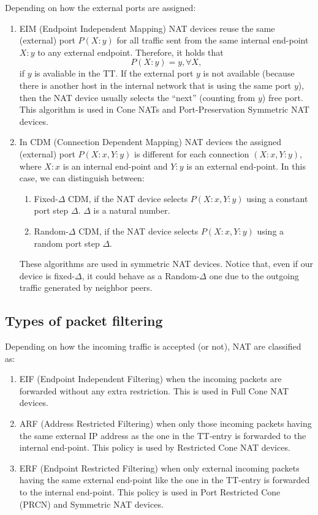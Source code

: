 Depending on how the external ports are assigned:

\begin{enumerate}
\item EIM (Endpoint Independent Mapping) NAT devices reuse the same
  (external) port $P(X:y)$ for all traffic sent from the same internal
  end-point $X:y$ to any external endpoint. Therefore, it holds that
  \begin{equation}
    P(X:y)=y, \forall X,
  \end{equation}
  if $y$ is avaliable in the TT. If the external port $y$ is not
  available (because there is another host in the internal network
  that is using the same port $y$), then the NAT device usually
  selects the ``next'' (counting from $y$) free port.  This algorithm
  is used in Cone NATs and Port-Preservation Symmetric NAT devices.
\item In CDM (Connection Dependent Mapping) NAT devices the assigned
  (external) port $P(X:x,Y:y)$ is different for each connection
  $(X:x,Y:y)$, where $X:x$ is an internal end-point and $Y:y$ is an
  external end-point. In this case, we can distinguish between:
  \begin{enumerate}
  \item Fixed-$\Delta$ CDM, if the NAT device selects $P(X:x,Y:y)$
    using a constant port step $\Delta$. $\Delta$ is a natural number.
    \item Random-$\Delta$ CDM, if the NAT device selects $P(X:x,Y:y)$
      using a random port step $\Delta$.
  \end{enumerate}
  These algorithms are used in symmetric NAT devices. Notice that,
  even if our device is fixed-$\Delta$, it could behave as a
  Random-$\Delta$ one due to the outgoing traffic generated by
  neighbor peers.
\end{enumerate}

\subsection{Types of packet filtering}

Depending on how the incoming traffic is accepted (or not), NAT are
classified as:

\begin{enumerate}
\item EIF (Endpoint Independent Filtering) when the incoming packets
  are forwarded without any extra restriction. This is used in Full
  Cone NAT devices.
\item ARF (Address Restricted Filtering) when only those incoming
  packets having the same external IP address as the one in the
  TT-entry is forwarded to the internal end-point. This policy is used
  by Restricted Cone NAT devices.
\item ERF (Endpoint Restricted Filtering) when only external incoming
  packets having the same external end-point like the one in the
  TT-entry is forwarded to the internal end-point. This policy is used
  in Port Restricted Cone (PRCN) and Symmetric NAT devices.
\end{enumerate}

